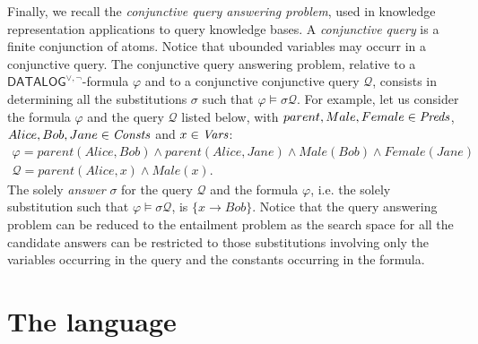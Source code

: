 \documentclass[manyauthors]{fundam}
\newcommand{\DisjDatalog}{\ensuremath{\mathsf{DATALOG}^{\vee,\neg}}\xspace}
\newcommand{\nat}{\mathbb{N}}
\begin{document}
Finally, we recall the \emph{conjunctive query answering problem},
used in knowledge representation applications to query
knowledge bases.
A \emph{conjunctive query} is a finite conjunction of atoms. Notice that
ubounded variables may occurr in a conjunctive query. 
The conjunctive query answering problem, relative to a $\DisjDatalog$-formula
$\varphi$ and to a conjunctive conjunctive query $\mathcal{Q}$, 
consists in determining all the substitutions $\sigma$ such that $\varphi
\models \sigma \mathcal{Q}$. For example, let us consider the formula $\varphi$
and the query $\mathcal{Q}$ listed below, with $parent, Male, Female \in
\mathit{Preds}$, $Alice, Bob, Jane \in \mathit{Consts}$ and $x \in \mathit{Vars}$:
\[
\begin{array}{l}
\varphi = parent(Alice, Bob) \wedge parent(Alice, Jane) \wedge Male(Bob) \wedge
Female(Jane) \\
\mathcal{Q} = parent(Alice, x) \wedge Male(x) .
\end{array}
\]
The solely \emph{answer} $\sigma$ for the query $\mathcal{Q}$ and the formula
$\varphi$, i.e. the solely substitution such that $\varphi 
\models \sigma \mathcal{Q}$, is $\{ x \rightarrow Bob \}$. Notice that the
query answering problem can be reduced to the entailment problem as the
search space for all the candidate answers can be restricted to 
those substitutions involving only the variables occurring in the query 
and the constants occurring in the formula. 


\section{The language \Forallpizero}\label{FORALLPIZERO}
\end{document}
